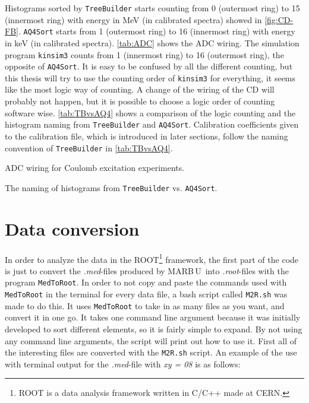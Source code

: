 \documentclass[twoside,english]{uiofysmaster/uiofysmaster}
\newcommand{\MBOU}{MAR\belowbaseline[-2pt]{a}B\stackinset{l}{3pt}{b}{-3pt}{O}{O}\,U}
\begin{document}
Histograms sorted by \texttt{TreeBuilder} starts counting from 0 (outermost ring) to 15 (innermost ring) with energy in MeV (in calibrated spectra) showed in \autoref{fig:CD-FB}. 
\texttt{AQ4Sort} starts from 1 (outermost ring) to 16 (innermost ring) with energy in keV (in calibrated spectra). 
\autoref{tab:ADC} shows the ADC wiring.
The simulation program \texttt{kinsim3} counts from 1 (innermost ring) to 16 (outermost ring), the opposite of \texttt{AQ4Sort}. 
It is easy to be confused by all the different counting, but this thesis will try to use the counting order of \texttt{kinsim3} for everything, it seems like the most logic way of counting. 
A change of the wiring of the CD will probably not happen, but it is possible to choose a logic order of counting software wise.
\autoref{tab:TBvsAQ4} shows a comparison of the logic counting and the histogram naming from \texttt{TreeBuilder} and \texttt{AQ4Sort}.
Calibration coefficients given to the calibration file, which is introduced in later sections, follow the naming convention of \texttt{TreeBuilder} in \autoref{tab:TBvsAQ4}.


\begin{table}[ht] 
	\centering 
	\caption{ADC wiring for Coulomb excitation experiments.}
	
	\label{tab:ADC}
\end{table}


\begin{table}[ht] 
	\centering 
	\caption{The naming of histograms from \texttt{TreeBuilder} vs. \texttt{AQ4Sort}.}
	
	\label{tab:TBvsAQ4}
\end{table}


\section{Data conversion}
In order to analyze the data in the ROOT\footnote{ROOT is a data analysis framework written in C/C++ made at CERN.} framework, the first part of the code is just to convert the \textit{.med}-files produced by \MBOU\ into \textit{.root}-files with the program \texttt{MedToRoot}. In order to not copy and paste the commands used with \texttt{MedToRoot} in the terminal for every data file, a bash script called \texttt{M2R.sh} was made to do this. It uses \texttt{MedToRoot} to take in as many files as you want, and convert it in one go. It takes one command line argument because it was initially developed to sort different elements, so it is fairly simple to expand. By not using any command line arguments, the script will print out how to use it. First all of the interesting files are converted with the \texttt{M2R.sh} script. An example of the use with terminal output for the \textit{.med}-file with \textit{xy = 08} is as follows:
\end{document}
